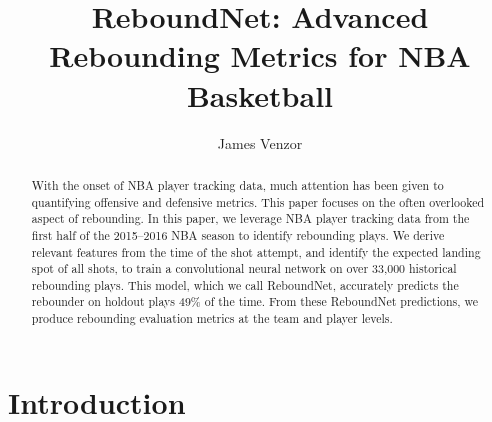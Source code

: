 \documentclass{article}
\begin{document}
\title{{ \bf ReboundNet: Advanced Rebounding Metrics for NBA Basketball}}
\author{James Venzor}
\maketitle

\begin{abstract}
\noindent
With the onset of NBA player tracking data, much attention has been given to quantifying offensive and defensive metrics. This paper focuses on the often overlooked aspect of rebounding. In this paper, we leverage NBA player tracking data from the first half of the 2015--2016 NBA season to identify rebounding plays. We derive relevant features from the time of the shot attempt, and identify the expected landing spot of all shots, to train a convolutional neural network on over 33,000 historical rebounding plays. This model, which we call ReboundNet, accurately predicts the rebounder on holdout plays 49\% of the time. From these ReboundNet predictions, we produce rebounding evaluation metrics at the team and player levels.
\end{abstract}

\section{Introduction}
\end{document}
